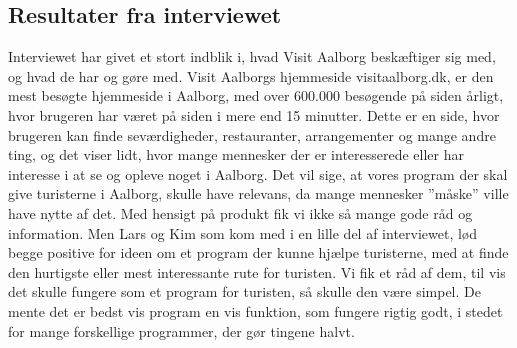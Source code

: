 \subsection{Resultater fra interviewet}
Interviewet har givet et stort indblik i, hvad Visit Aalborg beskæftiger sig med, og hvad de har og gøre med. Visit Aalborgs hjemmeside visitaalborg.dk, er den mest besøgte hjemmeside i Aalborg, med over 600.000 besøgende på siden årligt, hvor brugeren har været på siden i mere end 15 minutter. Dette er en side, hvor brugeren kan finde seværdigheder, restauranter, arrangementer og mange andre ting, og det viser lidt, hvor mange mennesker der er interesserede eller har interesse i at se og opleve noget i Aalborg. Det vil sige, at vores program der skal give turisterne i Aalborg, skulle have relevans, da mange mennesker ”måske” ville have nytte af det. 
Med hensigt på produkt fik vi ikke så mange gode råd og information. Men Lars og Kim som kom med i en lille del af interviewet, lød begge positive for ideen om et program der kunne hjælpe turisterne, med at finde den hurtigste eller mest interessante rute for turisten. Vi fik et råd af dem, til vis det skulle fungere som et program for turisten, så skulle den være simpel. De mente det er bedst vis program en vis funktion, som fungere rigtig godt, i stedet for mange forskellige programmer, der gør tingene halvt. 

